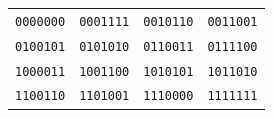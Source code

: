 \begin{center}\begin{tabular}{llll}
\texttt{0000000} & \texttt{0001111} & \texttt{0010110} & \texttt{0011001}\\
\texttt{0100101} & \texttt{0101010} & \texttt{0110011} & \texttt{0111100}\\
\texttt{1000011} & \texttt{1001100} & \texttt{1010101} & \texttt{1011010}\\
\texttt{1100110} & \texttt{1101001} & \texttt{1110000} & \texttt{1111111}
\end{tabular}\end{center}
